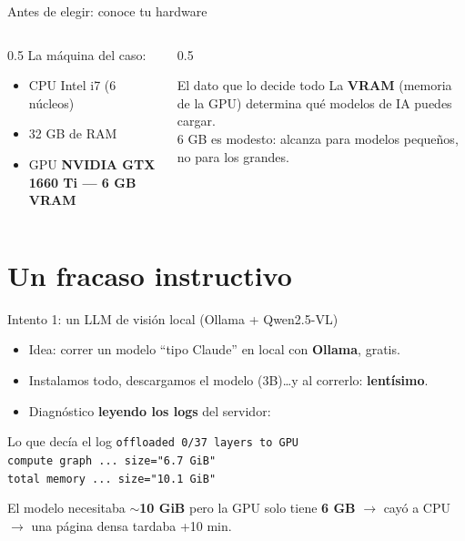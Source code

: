 \documentclass[10pt,aspectratio=169]{beamer}
\begin{document}
\begin{frame}{Antes de elegir: conoce tu hardware}
  \begin{columns}
    \begin{column}{0.5\textwidth}
      La máquina del caso:
      \begin{itemize}
        \item CPU Intel i7 (6 núcleos)
        \item 32 GB de RAM
        \item GPU \textbf{NVIDIA GTX 1660 Ti — 6 GB VRAM}
      \end{itemize}
    \end{column}
    \begin{column}{0.5\textwidth}
      \begin{alertblock}{El dato que lo decide todo}
        La \textbf{VRAM} (memoria de la GPU) determina qué modelos de IA puedes cargar.\\[4pt]
        6 GB es modesto: alcanza para modelos pequeños, no para los grandes.
      \end{alertblock}
    \end{column}
  \end{columns}
\end{frame}

\section{Un fracaso instructivo}

\begin{frame}{Intento 1: un LLM de visión local (Ollama + Qwen2.5-VL)}
  \begin{itemize}
    \item Idea: correr un modelo ``tipo Claude'' en local con \textbf{Ollama}, gratis.
    \item Instalamos todo, descargamos el modelo (3B)\ldots y al correrlo: \textbf{lentísimo}.
    \item Diagnóstico \textbf{leyendo los logs} del servidor:
  \end{itemize}
  \begin{exampleblock}{Lo que decía el log}
    \texttt{offloaded 0/37 layers to GPU}\\
    \texttt{compute graph ... size="6.7 GiB"}\\
    \texttt{total memory ... size="10.1 GiB"}
  \end{exampleblock}
  \centering
  El modelo necesitaba \textbf{$\sim$10 GiB} pero la GPU solo tiene \textbf{6 GB} $\rightarrow$ cayó a CPU $\rightarrow$ \textcolor{mal}{una página densa tardaba +10 min}.
\end{frame}
\end{document}
